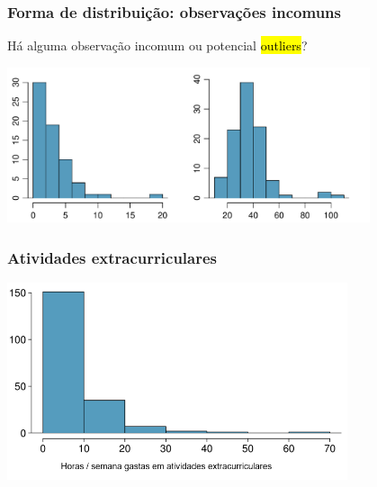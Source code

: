 \begin{frame}
\frametitle{Forma de distribuição: observações incomuns}
\justifying
Há alguma observação incomum ou potencial \hl{outliers}?

\begin{center}
\includegraphics[width=0.8\textwidth]{1-6_numerical_data/outlierPlots.pdf}
\end{center}

\end{frame}


\begin{frame}
\frametitle{Atividades extracurriculares}
\justifying
{}

\begin{center}
\includegraphics[width=0.75\textwidth]{1-6_numerical_data/extracurr_hrs_hist.png}
\end{center}
\justifying
{}

\end{frame}


